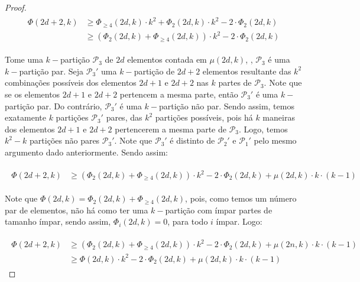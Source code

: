\documentclass[12pt]{article}
\begin{document}
\begin{proof}
  \begin{align}
  	\begin{split}
  		\Phi(2d+2, k) &\geq \Phi_{\geq 4}(2d, k) {\cdot} k^2 + \Phi_{2}(2d, k) {\cdot} k^2 - 2 {\cdot} \Phi_{2}(2d, k)\\
  		&\geq (\Phi_{2}(2d, k) + \Phi_{\geq 4}(2d, k)) {\cdot} k^2 - 2 {\cdot} \Phi_{2}(2d, k)
  	\end{split} 
  \end{align}  
   
  	 Tome uma $k-$partição $\mathcal{P}_3$ de $2d$ elementos contada em $\mu(2d, k)$, \ie, $\mathcal{P}_3$ é uma $k-$partição par. Seja $\mathcal{P}_3'$ uma $k-$partição de $2d+2$ elementos resultante das $k^2$ combinações possíveis dos elementos $2d+1$ e $2d+2$ nas $k$ partes de $\mathcal{P}_3$. Note que se os elementos $2d+1$ e $2d+2$ pertencem a mesma parte, então $\mathcal{P}_3'$ é uma $k-$partição par. Do contrário, $\mathcal{P}_3'$ é uma $k-$partição não par. Sendo assim, temos exatamente $k$ partições $\mathcal{P}_3'$ pares, das $k^2$ partições possíveis, pois há $k$ maneiras dos elementos $2d+1$ e $2d+2$ pertencerem a mesma parte de $\mathcal{P}_3$. Logo, temos $k^2 - k$ partições não pares $\mathcal{P}_3'$. Note que $\mathcal{P}_3'$ é distinto de $\mathcal{P}_2'$ e $\mathcal{P}_1'$ pelo mesmo argumento dado anteriormente. Sendo assim: 	
  	
  	 \begin{align}
  		\begin{split}
  			\Phi(2d+2, k) &\geq (\Phi_{2}(2d, k) + \Phi_{\geq 4}(2d, k)) {\cdot} k^2 - 2 {\cdot} \Phi_{2}(2d, k) + \mu(2d, k){\cdot} k {\cdot} (k-1)
  		\end{split} 
  	\end{align}  
  	
  	Note que $\Phi(2d, k) = \Phi_2(2d, k) + \Phi_{\geq 4}(2d, k)$, pois, como temos um número par de elementos, não há como ter uma $k-$partição com ímpar partes de tamanho ímpar, sendo assim, $\Phi_i(2d, k) = 0$, para todo $i$ ímpar. Logo: \newl
  	 
  	
  	\begin{align}
  		\begin{split}
  			\Phi(2d+2, k) &\geq (\Phi_{2}(2d, k) + \Phi_{\geq 4}(2d, k)) {\cdot} k^2 - 2 {\cdot} \Phi_{2}(2d, k) + \mu(2n, k){\cdot} k {\cdot} (k-1) \\
  			&\geq \Phi(2d, k) {\cdot} k^2 - 2 {\cdot} \Phi_{2}(2d, k) + \mu(2d, k){\cdot} k  {\cdot} (k-1)
  		\end{split} 
  	\end{align}   
  	

\end{proof}
\end{document}
